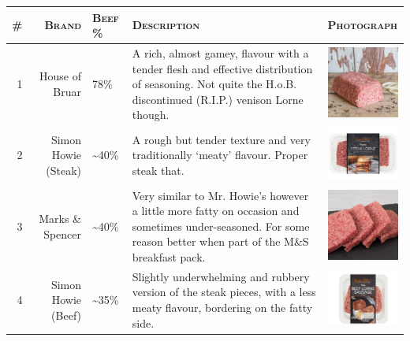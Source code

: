 \documentclass[11pt, english]{article}
\begin{document}
		\begin{table}[h]
			\scriptsize
			\renewcommand{\arraystretch}{1.25}
		\begin{center}
		\begin{tabular}{rr|p{1.25cm}p{3.5cm}p{2.5cm}}
			\textsc{\#} & \textsc{Brand} & \textsc{Beef \%} & \textsc{Description} & \textsc{Photograph}\\
			\hline
			1 & House of Bruar & 78\% & A rich, almost gamey, flavour with a tender flesh and effective distribution of seasoning. Not quite the H.o.B. discontinued (R.I.P.) venison Lorne though. & \vspace{-0.25cm}\includegraphics[width=2.5cm]{../System/Photos/bruar_lorne.jpg}\\
			2 & Simon Howie (Steak) & \textasciitilde40\% & A rough but tender texture and very traditionally `meaty' flavour. Proper steak that. & \vspace{-0.25cm}\includegraphics[width=2.5cm]{../System/Photos/sh_lorne.png}\\
			3 & Marks \& Spencer & \textasciitilde40\% & Very similar to Mr. Howie's however a little more fatty on occasion and sometimes under-seasoned. For some reason better when part of the M\&S breakfast pack. & \vspace{-0.25cm}\includegraphics[width=2.5cm]{../System/Photos/ms_lorne.jpeg}\\
			4 & Simon Howie (Beef) & \textasciitilde35\% & Slightly underwhelming and rubbery version of the steak pieces, with a less meaty flavour, bordering on the fatty side. & \vspace{-0.25cm}\includegraphics[width=2.5cm]{../System/Photos/sh_lorne2.png}\\

\end{tabular}
\end{center}
\end{table}
\end{document}
